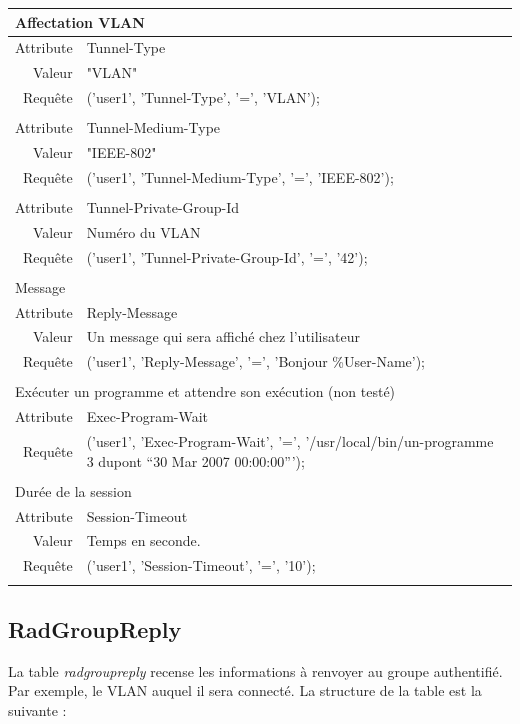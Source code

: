 \begin{tabular}{rl}
  \multicolumn{2}{l}{Affectation VLAN} \\
  \hline
  Attribute & Tunnel-Type \\
  Valeur & "VLAN" \\
	Requête & ('user1', 'Tunnel-Type', '=', 'VLAN'); \\
  \\
  Attribute & Tunnel-Medium-Type \\
  Valeur & "IEEE-802" \\
	Requête & ('user1', 'Tunnel-Medium-Type', '=', 'IEEE-802'); \\
  \\
  Attribute & Tunnel-Private-Group-Id \\
  Valeur & Numéro du VLAN \\
	Requête & ('user1', 'Tunnel-Private-Group-Id', '=', '42'); \\
  \\
	\multicolumn{2}{l}{Message} \\
  \hline
  Attribute & Reply-Message \\
  Valeur & Un message qui sera affiché chez l'utilisateur \\
	Requête & ('user1', 'Reply-Message', '=', 'Bonjour {\%User-Name}'); \\
	\\
	\multicolumn{2}{l}{Exécuter un programme et attendre son exécution (non testé)} \\
  \hline
  Attribute &  Exec-Program-Wait \\
  Requête & ('user1', 'Exec-Program-Wait', '=', '/usr/local/bin/un-programme 3 dupont “30 Mar 2007 00:00:00”'); \\
	\\
	\multicolumn{2}{l}{Durée de la session} \\
  \hline
  Attribute &  Session-Timeout \\
	Valeur & Temps en seconde. \\
  Requête & ('user1', 'Session-Timeout', '=', '10'); \\
	\\
\end{tabular}

\subsection{RadGroupReply}

La table \textit{radgroupreply} recense les informations à renvoyer au groupe authentifié. Par exemple, le VLAN auquel il sera connecté. La structure de la table est la suivante :

